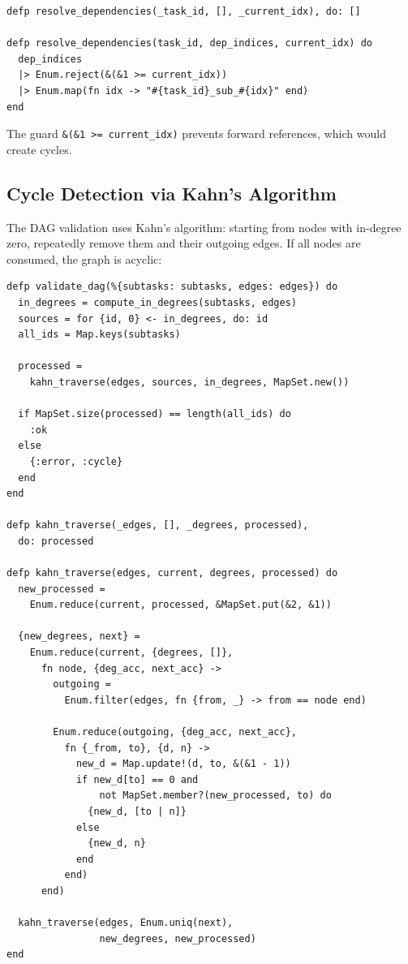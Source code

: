 \documentclass[12pt,a4paper]{article}
\theoremstyle{plain}
\theoremstyle{definition}
\begin{document}
\begin{lstlisting}[caption={Dependency resolution with safety checks},label={lst:decomp-deps}]
defp resolve_dependencies(_task_id, [], _current_idx), do: []

defp resolve_dependencies(task_id, dep_indices, current_idx) do
  dep_indices
  |> Enum.reject(&(&1 >= current_idx))
  |> Enum.map(fn idx -> "#{task_id}_sub_#{idx}" end)
end
\end{lstlisting}

The guard \texttt{\&(\&1 >= current\_idx)} prevents forward references, which would create cycles.

\subsection{Cycle Detection via Kahn's Algorithm}

The DAG validation uses Kahn's algorithm: starting from nodes with in-degree zero, repeatedly remove them and their outgoing edges. If all nodes are consumed, the graph is acyclic:

\begin{lstlisting}[caption={Kahn's algorithm for cycle detection},label={lst:decomp-kahn}]
defp validate_dag(%{subtasks: subtasks, edges: edges}) do
  in_degrees = compute_in_degrees(subtasks, edges)
  sources = for {id, 0} <- in_degrees, do: id
  all_ids = Map.keys(subtasks)

  processed =
    kahn_traverse(edges, sources, in_degrees, MapSet.new())

  if MapSet.size(processed) == length(all_ids) do
    :ok
  else
    {:error, :cycle}
  end
end

defp kahn_traverse(_edges, [], _degrees, processed),
  do: processed

defp kahn_traverse(edges, current, degrees, processed) do
  new_processed =
    Enum.reduce(current, processed, &MapSet.put(&2, &1))

  {new_degrees, next} =
    Enum.reduce(current, {degrees, []},
      fn node, {deg_acc, next_acc} ->
        outgoing =
          Enum.filter(edges, fn {from, _} -> from == node end)

        Enum.reduce(outgoing, {deg_acc, next_acc},
          fn {_from, to}, {d, n} ->
            new_d = Map.update!(d, to, &(&1 - 1))
            if new_d[to] == 0 and
                not MapSet.member?(new_processed, to) do
              {new_d, [to | n]}
            else
              {new_d, n}
            end
          end)
      end)

  kahn_traverse(edges, Enum.uniq(next),
                new_degrees, new_processed)
end
\end{lstlisting}
\end{document}
